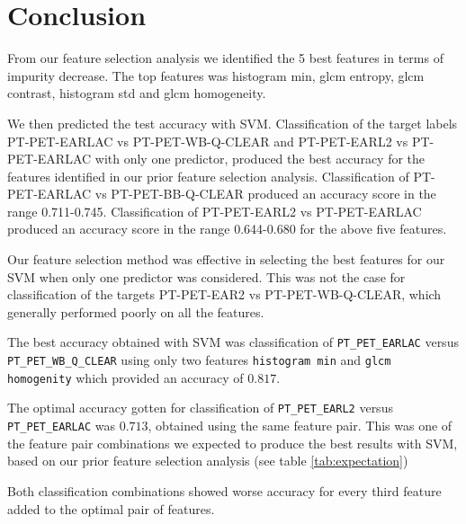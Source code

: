 \section{Conclusion}

From our feature selection analysis we identified the 5 best features in terms
of impurity decrease. The top features was histogram min, glcm entropy, glcm
contrast, histogram std and glcm homogeneity. 

We then predicted the test accuracy with SVM. Classification of the target
labels PT-PET-EARLAC vs PT-PET-WB-Q-CLEAR and PT-PET-EARL2 vs PT-PET-EARLAC
with only one predictor, produced the best accuracy for the features identified
in our prior feature selection analysis. 
Classification of PT-PET-EARLAC vs PT-PET-BB-Q-CLEAR produced an accuracy score
in the range 0.711-0.745. 
Classification of PT-PET-EARL2 vs PT-PET-EARLAC produced an accuracy score in
the range 0.644-0.680 for the above five features. 

Our feature selection method was
effective in selecting the best features for our SVM when only one predictor
was considered. 
This was not the case for classification of the targets PT-PET-EAR2 vs
PT-PET-WB-Q-CLEAR, which generally performed poorly on all the features. 





The best accuracy obtained with SVM was classification of \verb|PT_PET_EARLAC| versus \verb|PT_PET_WB_Q_CLEAR|
using only two features \verb|histogram min| and \verb|glcm homogenity| which provided 
an accuracy of $0.817$. 


The optimal accuracy gotten for classification of  \verb|PT_PET_EARL2| versus
\verb|PT_PET_EARLAC| was $0.713$, obtained using the same feature pair. 
This was one of the feature pair combinations we expected to produce the best
results with SVM, based on our prior feature selection analysis (see table
\ref{tab:expectation})

Both classification combinations showed worse accuracy for every 
third feature added to the optimal pair of features. 



